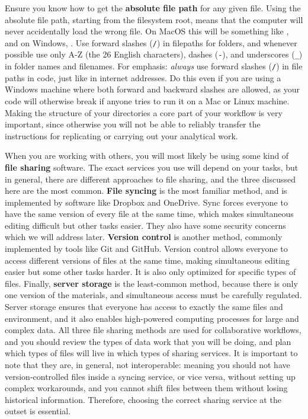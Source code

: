 Ensure you know how to get the \textbf{absolute file path} for any given file.
Using the absolute file path, starting from the filesystem root,
means that the computer will never accidentally load the wrong file.
On MacOS this will be something like ,
and on Windows, .
Use forward slashes (\texttt{/}) in filepaths for folders,
and whenever possible use only A-Z (the 26 English characters),
dashes (\texttt{-}), and underscores (\texttt{\_}) in folder names and filenames.
For emphasis: \textit{always} use forward slashes (\texttt{/}) in file paths in code,
just like in internet addresses. Do this even if you are using a Windows machine where
both forward and backward slashes are allowed, as your code will otherwise break
if anyone tries to run it on a Mac or Linux machine.
Making the structure of your directories a core part of your workflow is very important,
since otherwise you will not be able to reliably transfer the instructions
for replicating or carrying out your analytical work.

When you are working with others, you will most likely be using
some kind of \textbf{file sharing} software.
The exact services you use will depend on your tasks,
but in general, there are different approaches to file sharing, and the three discussed here are the most common.
\textbf{File syncing} is the most familiar method,
and is implemented by software like Dropbox and OneDrive.
Sync forces everyone to have the same version of every file at the same time,
which makes simultaneous editing difficult but other tasks easier.
They also have some security concerns which we will address later.
\textbf{Version control} is another method,
commonly implemented by tools like Git and GitHub.
Version control allows everyone to access different versions of files at the same time,
making simultaneous editing easier but some other tasks harder.
It is also only optimized for specific types of files.
Finally, \textbf{server storage} is the least-common method,
because there is only one version of the materials,
and simultaneous access must be carefully regulated.
Server storage ensures that everyone has access
to exactly the same files and environment, and it also enables
high-powered computing processes for large and complex data.
All three file sharing methods are used for collaborative workflows,
and you should review the types of data work
that you will be doing, and plan which types of files
will live in which types of sharing services.
It is important to note that they are, in general, not interoperable:
meaning you should not have version-controlled files inside a syncing service,
or vice versa, without setting up complex workarounds,
and you cannot shift files between them without losing historical information.
Therefore, choosing the correct sharing service at the outset is essential.

